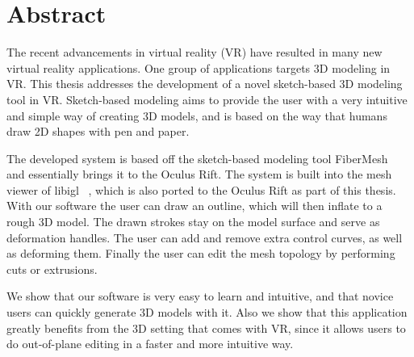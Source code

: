 \chapter*{Abstract}

The recent advancements in virtual reality (VR) have resulted in many new virtual reality applications. One group of applications targets 3D modeling in VR. This thesis addresses the development of a novel sketch-based 3D modeling tool in VR. Sketch-based modeling aims to provide the user with a very intuitive and simple way of creating 3D models, and is based on the way that humans draw 2D shapes with pen and paper. 

The developed system is based off the sketch-based modeling tool FiberMesh~\cite{Nealen2007} and essentially brings it to the Oculus Rift. The system is built into the mesh viewer of libigl ~\cite{Jacobson2017}, which is also ported to the Oculus Rift as part of this thesis. With our software the user can draw an outline, which will then inflate to a rough 3D model. The drawn strokes stay on the model surface and serve as deformation handles. The user can add and remove extra control curves, as well as deforming them. Finally the user can edit the mesh topology by performing cuts or extrusions. 

We show that our software is very easy to learn and intuitive, and that novice users can quickly generate 3D models with it. Also we show that this application greatly benefits from the 3D setting that comes with VR, since it allows users to do out-of-plane editing in a faster and more intuitive way. 

\cleardoublepage
